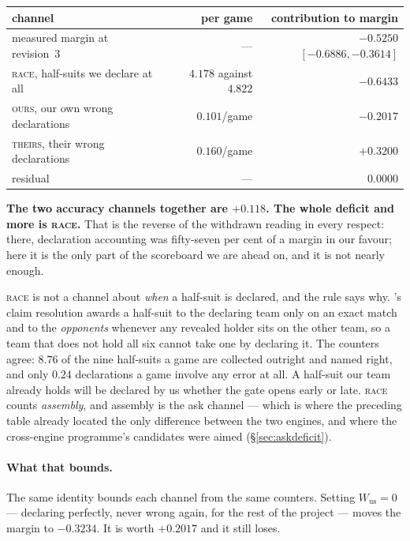 \documentclass[11pt,letterpaper]{article}
\begin{document}
\begin{center}
\small
\begin{tabular}{lrr}
\toprule
channel & per game & contribution to margin \\
\midrule
measured margin at revision~3 & --- & $\mathbf{-0.5250}$ $[-0.6886, -0.3614]$ \\
\textsc{race}, half-suits we declare at all & $4.178$ against $4.822$ &
$\mathbf{-0.6433}$ \\
\textsc{ours}, our own wrong declarations & $0.101$/game & $-0.2017$ \\
\textsc{theirs}, their wrong declarations & $0.160$/game & $+0.3200$ \\
\midrule
residual & --- & $0.0000$ \\
\bottomrule
\end{tabular}
\end{center}

\noindent \textbf{The two accuracy channels together are $+0.118$. The whole
deficit and more is \textsc{race}.} That is the reverse of the withdrawn
reading in every respect: there, declaration accounting was fifty-seven per
cent of a margin in our favour; here it is the only part of the scoreboard we
are ahead on, and it is not nearly enough.

\textsc{race} is not a channel about \emph{when} a half-suit is declared, and
the rule says why. 's claim resolution awards a
half-suit to the declaring team only on an exact match and to the
\emph{opponents} whenever any revealed holder sits on the other team, so a
team that does not hold all six cannot take one by declaring it. The counters
agree: $8.76$ of the nine half-suits a game are collected outright and named
right, and only $0.24$ declarations a game involve any error at all. A
half-suit our team already holds will be declared by us whether the gate
opens early or late. \textsc{race} counts \emph{assembly}, and assembly is
the ask channel --- which is where the preceding table already located the
only difference between the two engines, and where the cross-engine
programme's candidates were aimed (\S\ref{sec:askdeficit}).

\paragraph{What that bounds.} The same identity bounds each channel from the
same counters. Setting $W_{\text{us}} = 0$ --- declaring perfectly, never
wrong again, for the rest of the project --- moves the margin to $-0.3234$.
It is worth $\mathbf{+0.2017}$ and it still loses.
\end{document}
